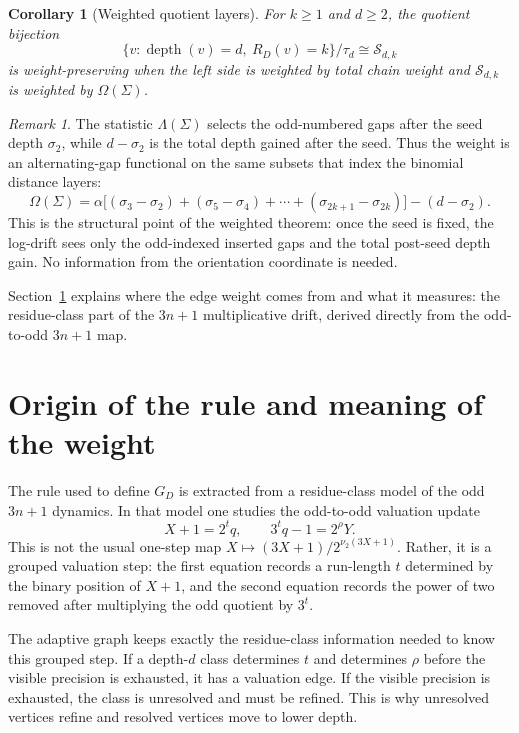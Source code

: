 \documentclass[11pt]{amsart}
\newtheorem{corollary}[theorem]{Corollary}
\theoremstyle{definition}
\theoremstyle{remark}
\newtheorem{remark}[theorem]{Remark}
\newcommand{\nuu}{\nu_2}
\newcommand{\depth}{\operatorname{depth}}
\newcommand{\Sfam}{\mathcal S}
\begin{document}
\begin{corollary}[Weighted quotient layers]\label{cor:weightedquotient}
For $k\ge1$ and $d\ge2$, the quotient bijection
\[
\{v:\depth(v)=d,\ R_D(v)=k\}/\tau_d\cong\Sfam_{d,k}
\]
is weight-preserving when the left side is weighted by total chain weight and $\Sfam_{d,k}$ is weighted by $\Omega(\Sigma)$.
\end{corollary}

\begin{remark}
The statistic $\Lambda(\Sigma)$ selects the odd-numbered gaps after the seed depth $\sigma_2$, while $d-\sigma_2$ is the total depth gained after the seed.  Thus the weight is an alternating-gap functional on the same subsets that index the binomial distance layers:
\[
\Omega(\Sigma)
=
\alpha\bigl[(\sigma_3-\sigma_2)+(\sigma_5-\sigma_4)+\cdots+(\sigma_{2k+1}-\sigma_{2k})\bigr]
-(d-\sigma_2).
\]
This is the structural point of the weighted theorem: once the seed is fixed, the log-drift sees only the odd-indexed inserted gaps and the total post-seed depth gain.  No information from the orientation coordinate is needed.
\end{remark}

Section~\ref{sec:collatz} explains where the edge weight comes from and what it measures: the residue-class part of the $3n+1$ multiplicative drift, derived directly from the odd-to-odd $3n+1$ map.

\section{Origin of the rule and meaning of the weight}\label{sec:collatz}

The rule used to define $G_D$ is extracted from a residue-class model of the odd $3n+1$ dynamics.  In that model one studies the odd-to-odd valuation update
\[
X+1=2^tq,
\qquad
3^tq-1=2^\rho Y.
\]
This is not the usual one-step map $X\mapsto (3X+1)/2^{\nuu(3X+1)}$.  Rather, it is a grouped valuation step: the first equation records a run-length $t$ determined by the binary position of $X+1$, and the second equation records the power of two removed after multiplying the odd quotient by $3^t$.

The adaptive graph keeps exactly the residue-class information needed to know this grouped step.  If a depth-$d$ class determines $t$ and determines $\rho$ before the visible precision is exhausted, it has a valuation edge.  If the visible precision is exhausted, the class is unresolved and must be refined.  This is why unresolved vertices refine and resolved vertices move to lower depth.
\end{document}
